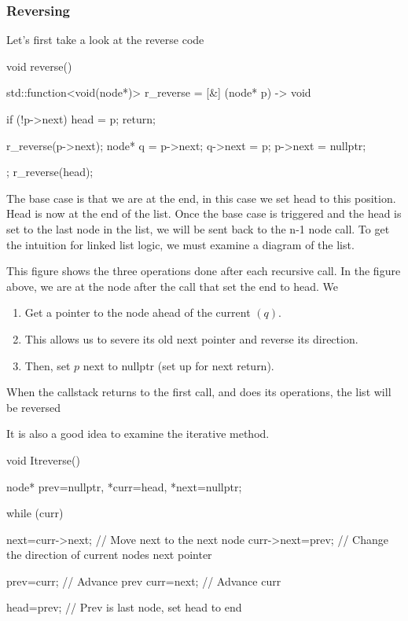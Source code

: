 \documentclass{report}
\begin{document}
\pagebreak 
\subsubsection{Reversing}
\bigbreak \noindent 
Let's first take a look at the reverse code
\bigbreak \noindent 
\begin{cppcode}
    void reverse() {
        std::function<void(node*)> r_reverse = [&] (node* p) -> void {
            if (!p->next) {
                head = p;
                return;
            }

            r_reverse(p->next);
            node* q = p->next;
            q->next = p;
            p->next = nullptr;

        };
        r_reverse(head);
    }
\end{cppcode}
\bigbreak \noindent 
The base case is that we are at the end, in this case we set head to this position. Head is now at the end of the list.
\bigbreak \noindent 
Once the base case is triggered and the head is set to the last node in the list, we will be sent back to the n-1 node call.
\bigbreak \noindent 
To get the intuition for linked list logic, we must examine a diagram of the list.
\bigbreak \noindent 
\begin{figure}[ht]
    \centering
    \label{fig:diag}
\end{figure}
\bigbreak \noindent 
This figure shows the three operations done after each recursive call. In the figure above, we are at the node after the call that set the end to head. We
\begin{enumerate}
    \item Get a pointer to the node ahead of the current $(q)$. 
    \item This allows us to severe its old next pointer and reverse its direction.
    \item Then, set $p$ next to nullptr (set up for next return).
\end{enumerate}
When the callstack returns to the first call, and does its operations, the list will be reversed

\bigbreak \noindent 
It is also a good idea to examine the iterative method.
\bigbreak \noindent 
\begin{cppcode}
    void Itreverse() {
        node* prev=nullptr, *curr=head, *next=nullptr;

        while (curr) {
            next=curr->next; // Move next to the next node
            curr->next=prev; // Change the direction of current nodes next pointer

            prev=curr; // Advance prev
            curr=next; // Advance curr
        }
        head=prev; // Prev is last node, set head to end
    }
\end{cppcode}
\end{document}
